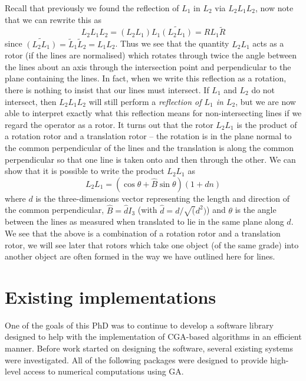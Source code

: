  Recall that
previously we found the reflection of $L_1$ in $L_2$ via
$L_2L_1L_2$, now note that we can rewrite this as
%
\begin{equation}
 L_2L_1L_2 = (L_2L_1)L_1\widetilde{(L_2L_1)} = RL_1\tilde{R}
\end{equation}
%
since $\widetilde{(L_2L_1)} = \tilde{L}_1\tilde{L}_2=L_1L_2$.
Thus we see that the quantity $L_2L_1$ acts as a rotor
(if the lines are normalised) which rotates through twice
the angle between the lines about an axis through the
intersection point and perpendicular to the plane
containing the lines. In fact, when we write this
reflection as a rotation, there is nothing to insist that
our lines must intersect. If $L_1$ and $L_2$ do not
intersect, then $L_2L_1L_2$ will still perform a {\em
reflection of $L_1$ in $L_2$}, but we are now able to
interpret exactly what this reflection means for
non-intersecting lines if we regard the operator as a
rotor. It turns out that the rotor $L_2L_1$ is the
product of a rotation rotor and a translation rotor --
the rotation is in the plane normal to the common
perpendicular of the lines and the translation is along
the common perpendicular so that one line is taken onto
and then through the other. We can show that it is
possible to write the product $L_2L_1$ as
%
\begin{equation}
L_2L_1 = (\cos{\theta} + \hat{B}\sin{\theta})(1 + dn)
\end{equation}
%
where $d$ is the three-dimensions vector representing the length and
direction of the common perpendicular, $\hat{B} =
\hat{d}I_3$ (with $\hat{d}=d/\sqrt(d^2)$) and  $\theta$
is the angle between the lines as measured when
translated to lie in the same plane along $d$. We see
that the above is a combination of a rotation rotor and a
translation rotor, we will see later that rotors which
take one object (of the same grade) into another object
are often formed in the way we have outlined here for
lines.

\section{Existing implementations}

One of the goals of this PhD was to continue to develop a software
library designed to help with the implementation of CGA-based algorithms
in an efficient manner. Before work started on designing 
the software, several existing systems 
were investigated. All of the following packages were designed to
provide high-level access to numerical computations using GA.

